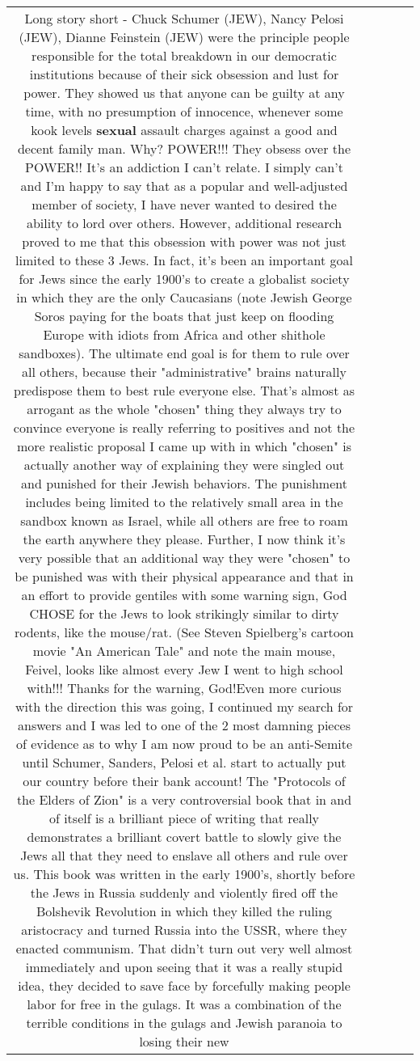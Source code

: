 \documentclass[11pt]{article}
\newlength\mylength
\begin{document}
\begin{center}
\begin{longtable}{|C{.65\mylength}|C{.30\mylength}|C{.12\mylength}|C{.12\mylength}|C{.12\mylength}|}
  \small Long story short - Chuck Schumer (JEW), Nancy Pelosi (JEW), Dianne Feinstein (JEW) were the principle people responsible for the total breakdown in our democratic institutions because of their sick obsession and lust for power.  They showed us that anyone can be guilty at any time, with no presumption of innocence, whenever some kook levels \textbf{sexual} assault charges against a good and decent family man.  Why?  POWER!!!  They obsess over the POWER!! It's an addiction I can't relate.  I simply can't and I'm happy to say that as a popular and well-adjusted member of society, I have never wanted to desired the ability to lord over others.  However, additional research proved to me that this obsession with power was not just limited to these 3 Jews.  In fact, it's been an important goal for Jews since the early 1900's to create a globalist society in which they are the only Caucasians (note Jewish George Soros paying for the boats that just keep on flooding Europe with idiots from Africa and other shithole sandboxes). The ultimate end goal is for them to rule over all others, because their "administrative" brains naturally predispose them to best rule everyone else. That's almost as arrogant as the whole "chosen" thing they always try to convince everyone is really referring to positives and not the more realistic proposal I came up with in which "chosen" is actually another way of explaining they were singled out and punished for their Jewish behaviors.  The punishment includes being limited to the relatively small area in the sandbox known as Israel, while all others are free to roam the earth anywhere they please. Further, I now think it's very possible that an additional way they were "chosen" to be punished was with their physical appearance and that in an effort to provide gentiles with some warning sign, God CHOSE for the Jews to look strikingly similar to dirty rodents, like the mouse/rat. (See Steven Spielberg's cartoon movie "An American Tale" and note the main mouse, Feivel, looks like almost every Jew I went to high school with!!!  Thanks for the warning, God!Even more curious with the direction this was going, I continued my search for answers and I was led to one of the 2 most damning pieces of evidence as to why I am now proud to be an anti-Semite until Schumer, Sanders, Pelosi et al. start to actually put our country before their bank account!  The "Protocols of the Elders of Zion" is a very controversial book that in and of itself is a brilliant piece of writing that really demonstrates a brilliant covert battle to slowly give the Jews all that they need to enslave all others and rule over us.  This book was written in the early 1900's, shortly before the Jews in Russia suddenly and violently fired off the Bolshevik Revolution in which they killed the ruling aristocracy and turned Russia into the USSR, where they enacted communism. That didn't turn out very well almost immediately and upon seeing that it was a really stupid idea, they decided to save face by forcefully making people labor for free in the gulags.  It was a combination of the terrible conditions in the gulags and Jewish paranoia to losing their new 
\end{longtable}
\end{center}
\end{document}
